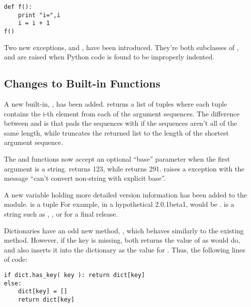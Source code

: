 \documentclass{howto}
\begin{document}
\begin{verbatim}
def f():
    print "i=",i
    i = i + 1 
f()
\end{verbatim}

Two new exceptions,  and
, have been introduced.  They're both
subclasses of , and are raised when Python code
is found to be improperly indented.

\subsection{Changes to Built-in Functions}

A new built-in, , has been
added.   returns a list of tuples where each tuple
contains the i-th element from each of the argument sequences.  The
difference between  and  is that  pads the sequences with
 if the sequences aren't all of the same length, while
 truncates the returned list to the length of the
shortest argument sequence.

The  and  functions now accept an
optional ``base'' parameter when the first argument is a string.
 returns 123, while  returns
291.   raises a  exception
with the message ``can't convert non-string with explicit base''.

A new variable holding more detailed version information has been
added to the  module.   is a tuple
 For example, in a hypothetical 2.0.1beta1,
 would be .
 is a string such as , , or
 for a final release.

Dictionaries have an odd new method, , which behaves similarly to the existing
 method.  However, if the key is missing,
 both returns the value of  as
 would do, and also inserts it into the dictionary as
the value for .  Thus, the following lines of code:

\begin{verbatim}
if dict.has_key( key ): return dict[key]
else: 
    dict[key] = []
    return dict[key]
\end{verbatim}
\end{document}
